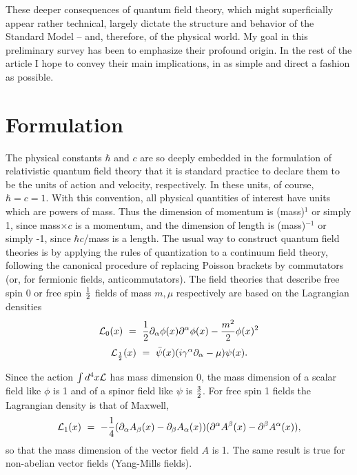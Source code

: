 \documentclass[aps,epsf]{revtex4}
\begin{document}
These deeper consequences of quantum field
theory, which might superficially appear rather technical, largely
dictate the structure and behavior of the Standard Model -- and,
therefore, of the physical world.  My goal in this preliminary survey
has been to emphasize their profound origin.  In the rest of the
article I hope to convey their main implications, in as simple and
direct a fashion as possible.


\section{ Formulation}


The physical constants $\hbar$ and $c$ are so deeply embedded in the
formulation of relativistic quantum field theory that it is standard
practice to declare them to be the units of action and velocity,
respectively.  In these units, of course, $\hbar = c = 1$.   With this
convention,  all physical quantities of interest have units which are
powers of mass.  Thus the dimension of momentum is (mass)$^1$ or
simply 1, since mass$\times c$ is a momentum, and the dimension of
length is  (mass)$^{-1}$ or simply -1, since $\hbar c$/mass is a
length.  The usual way to construct quantum field theories is by
applying the rules of quantization to a continuum field theory,
following the canonical procedure of replacing Poisson brackets by
commutators (or, for fermionic fields, anticommutators).  The field
theories that describe free spin 0 or free spin ${1\over 2}$ fields of
mass $m, \mu$ respectively are based on the Lagrangian
densities
\begin{equation}{\cal L}_0 (x)~=~ {1\over 2} \partial_\alpha
\phi(x) \partial^\alpha \phi(x)  - {m^2\over 2}
\phi(x)^2\label{eq:spinzero}
\end{equation}
\begin{equation}{\cal
L}_{1\over 2}(x) ~=~ \bar \psi(x) (i \gamma^\alpha \partial_\alpha  -
\mu) \psi(x) .\label{eq:spinhalf}
\end{equation}

Since the action $\int
d^4x {\cal L}$ has mass dimension 0, the mass dimension of a scalar
field like $\phi$ is 1 and of a spinor field like $\psi$ is ${3\over
2}$.  For free spin 1 fields the Lagrangian density is that of
Maxwell,
\begin{equation}{\cal L}_1 (x) ~=~ -{1\over 4}
(\partial_\alpha A_\beta (x) - \partial_\beta A_\alpha (x) )
(\partial^\alpha A^\beta (x) - \partial^\beta A^\alpha (x)
),\label{eq:spinone}
\end{equation}
so that the mass dimension of the
vector field $A$ is 1.   The same result is true for non-abelian
vector fields (Yang-Mills fields).  
\end{document}
